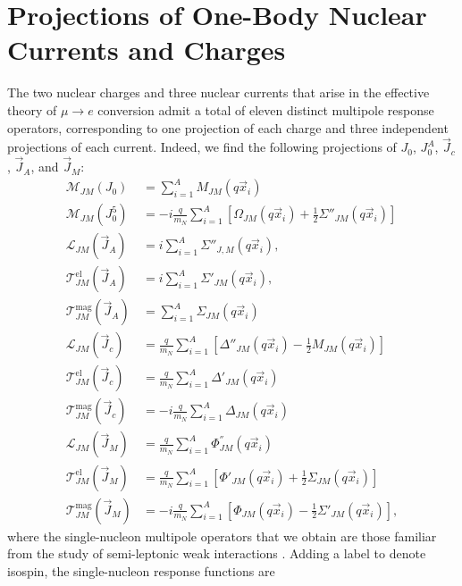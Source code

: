 \documentclass{book}[letterpaper,12pt]
\begin{document}
\section{Projections of One-Body Nuclear Currents and Charges}
\label{sec:single_nucleon_operators}
The two nuclear charges and three nuclear currents that arise in the effective theory of $\mu\rightarrow e$ conversion admit a total of eleven distinct multipole response operators, corresponding to one projection of each charge and three independent projections of each current. Indeed, we find the following projections of $J_0$, $J_0^A$, $\vec{J}_c$, $\vec{J}_A$, and $\vec{J}_M$:
\begin{equation}
\begin{split}
\mathcal{M}_{JM}(J_0)&=\sum_{i=1}^AM_{JM}(q\vec{x}_i)\\
\mathcal{M}_{JM}(J^5_0)&=-i\frac{q}{m_N}\sum_{i=1}^A \left[\Omega_{JM}(q\vec{x}_i)+\frac{1}{2}\Sigma''_{JM}(q\vec{x}_i)\right]\\
\mathcal{L}_{JM}(\vec{J}_A)&=i\sum_{i=1}^A\Sigma''_{J,M}(q\vec{x}_i),\\
\mathcal{T}^{\mathrm{el}}_{JM}(\vec{J}_A)&=i\sum_{i=1}^A\Sigma'_{JM}(q\vec{x}_i),\\
\mathcal{T}^{\mathrm{mag}}_{JM}(\vec{J}_A)&=\sum_{i=1}^A\Sigma_{JM}(q\vec{x}_i)\\
\mathcal{L}_{JM}(\vec{J}_c)&=\frac{q}{m_N}\sum_{i=1}^A \left[\Delta''_{JM}(q\vec{x}_i)-\frac{1}{2}M_{JM}(q\vec{x}_i)\right]\\
\mathcal{T}^{\mathrm{el}}_{JM}(\vec{J}_c)&=\frac{q}{m_N}\sum_{i=1}^A\Delta'_{JM}(q\vec{x}_i)\\
\mathcal{T}^{\mathrm{mag}}_{JM}(\vec{J}_c)&=-i\frac{q}{m_N}\sum_{i=1}^A\Delta_{JM}(q\vec{x}_i)\\
\mathcal{L}_{JM}(\vec{J}_M)&=\frac{q}{m_N}\sum_{i=1}^A\Phi^{''}_{JM}(q\vec{x}_i)\\
\mathcal{T}^{\mathrm{el}}_{JM}(\vec{J}_M)&=\frac{q}{m_N}\sum_{i=1}^A\left[\Phi'_{JM}(q\vec{x}_i)+\frac{1}{2}\Sigma_{JM}(q\vec{x}_i)\right]\\
\mathcal{T}^{\mathrm{mag}}_{JM}(\vec{J}_M)&=-i\frac{q}{m_N}\sum_{i=1}^A\left[\Phi_{JM}(q\vec{x}_i)-\frac{1}{2}\Sigma'_{JM}(q\vec{x}_i)\right],
\end{split}
\end{equation}
where the single-nucleon multipole operators that we obtain are those familiar from the study of semi-leptonic weak interactions \cite{DONNELLY1979103,SEROT1979408}. Adding a label to denote isospin, the single-nucleon response functions are
\end{document}
